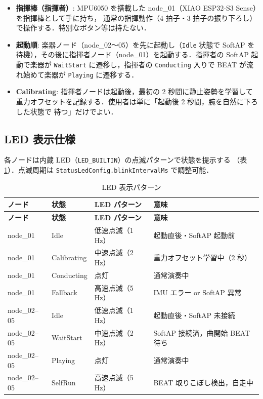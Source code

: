 \documentclass[lualatex,book,paper=a4paper,jafontsize=11.5pt,jafontscale=1.05]{jlreq}
\begin{document}
\begin{itemize}
  \item \textbf{指揮棒（指揮者）}: MPU6050 を搭載した node\_01（XIAO ESP32-S3 Sense）を指揮棒として手に持ち，
        通常の指揮動作（4 拍子・3 拍子の振り下ろし）で操作する．特別なボタン等は持たない．
  \item \textbf{起動順}: 楽器ノード（node\_02〜05）を先に起動し（\texttt{Idle} 状態で
        SoftAP を待機），その後に指揮者ノード（node\_01）を起動する．指揮者の SoftAP
        起動で楽器が \texttt{WaitStart} に遷移し，指揮者の \texttt{Conducting} 入りで
        BEAT が流れ始めて楽器が \texttt{Playing} に遷移する．
  \item \textbf{Calibrating}: 指揮者ノードは起動後，最初の 2 秒間に静止姿勢を学習して
        重力オフセットを記録する．使用者は単に「起動後 2 秒間，腕を自然に下ろした状態で
        待つ」だけでよい．
\end{itemize}

\subsection{LED 表示仕様}

各ノードは内蔵 LED（\texttt{LED\_BUILTIN}）の点滅パターンで状態を提示する
（表 \ref{tab:led-spec}）．点滅周期は \texttt{StatusLedConfig.blinkIntervalMs} で調整可能．

\begin{longtable}{p{} p{} p{} p{}}
\caption{LED 表示パターン}\label{tab:led-spec}\\
\toprule
\textbf{ノード} & \textbf{状態} & \textbf{LED パターン} & \textbf{意味} \\
\midrule
\endfirsthead
\toprule
\textbf{ノード} & \textbf{状態} & \textbf{LED パターン} & \textbf{意味} \\
\midrule
\endhead
node\_01     & Idle        & 低速点滅（1 Hz）   & 起動直後・SoftAP 起動前 \\
node\_01     & Calibrating & 中速点滅（2 Hz）   & 重力オフセット学習中（2 秒） \\
node\_01     & Conducting  & 点灯               & 通常演奏中 \\
node\_01     & Fallback    & 高速点滅（5 Hz）   & IMU エラー or SoftAP 異常 \\
node\_02--05 & Idle        & 低速点滅（1 Hz）   & 起動直後・SoftAP 未接続 \\
node\_02--05 & WaitStart   & 中速点滅（2 Hz）   & SoftAP 接続済，曲開始 BEAT 待ち \\
node\_02--05 & Playing     & 点灯               & 通常演奏中 \\
node\_02--05 & SelfRun     & 高速点滅（5 Hz）   & BEAT 取りこぼし検出，自走中 \\
\bottomrule
\end{longtable}
\end{document}
